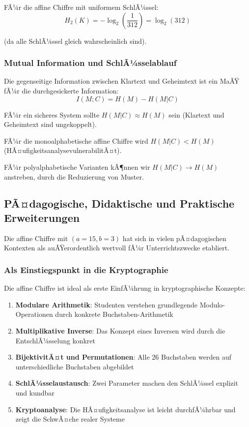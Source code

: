 ﻿\documentclass[12pt,a4paper]{article}
\begin{document}
	FÃ¼r die affine Chiffre mit uniformem SchlÃ¼ssel:
	\begin{equation}
		H_2(K) = -\log_2\left(\frac{1}{312}\right) = \log_2(312)
	\end{equation}
	
	(da alle SchlÃ¼ssel gleich wahrscheinlich sind).
	
	\subsubsection{Mutual Information und SchlÃ¼sselablauf}
	
	Die gegenseitige Information zwischen Klartext und Geheimtext ist ein MaÃŸ fÃ¼r die durchgesickerte Information:
	\begin{equation}
		I(M; C) = H(M) - H(M|C)
	\end{equation}
	
	FÃ¼r ein sicheres System sollte $H(M|C) \approx H(M)$ sein (Klartext und Geheimtext sind ungekoppelt).
	
	FÃ¼r die monoalphabetische affine Chiffre wird $H(M|C) < H(M)$ (HÃ¤ufigkeitsanalyse\-vulnerabilitÃ¤t).
	
	FÃ¼r polyalphabetische Varianten kÃ¶nnen wir $H(M|C) \to H(M)$ anstreben, durch die Reduzierung von Muster.
	
	
	\subsection{PÃ¤dagogische, Didaktische und Praktische Erweiterungen}
	
	Die affine Chiffre mit $(a=15, b=3)$ hat sich in vielen pÃ¤dagogischen Kontexten als auÃŸerordentlich wertvoll fÃ¼r Unterrichtszwecke etabliert.
	
	\subsubsection{Als Einstiegspunkt in die Kryptographie}
	
	Die affine Chiffre ist ideal als erste EinfÃ¼hrung in kryptographische Konzepte:
	\begin{enumerate}
		\item \textbf{Modulare Arithmetik}: Studenten verstehen grundlegende Modulo-Operationen durch konkrete Buchstaben-Arithmetik
		\item \textbf{Multiplikative Inverse}: Das Konzept eines Inversen wird durch die EntschlÃ¼sselung konkret
		\item \textbf{BijektivitÃ¤t und Permutationen}: Alle 26 Buchstaben werden auf unterschiedliche Buchstaben abgebildet
		\item \textbf{SchlÃ¼sselaustausch}: Zwei Parameter machen den SchlÃ¼ssel explizit und kundbar
		\item \textbf{Kryptoanalyse}: Die HÃ¤ufigkeitsanalyse ist leicht durchfÃ¼hrbar und zeigt die SchwÃ¤che realer Systeme
	\end{enumerate}
	
\end{document}
